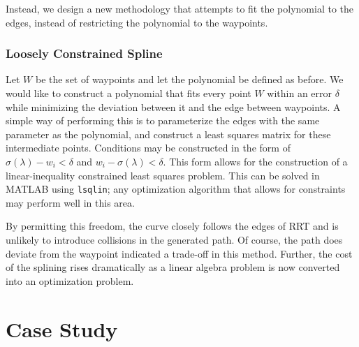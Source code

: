 \documentclass[oneside, 11pt]{book}
\begin{document}
Instead, we design a new methodology that attempts to fit the polynomial to the edges, instead of restricting the polynomial to the waypoints.

\subsection{Loosely Constrained Spline}\label{sec:restrictpolyfit}
Let $W$ be the set of waypoints and let the polynomial be defined as before. We would like to construct a polynomial that fits every point $W$ within an error $\delta$ while minimizing the deviation between it and the edge between waypoints. A simple way of performing this is to parameterize the edges with the same parameter as the polynomial, and construct a least squares matrix for these intermediate points. Conditions may be constructed in the form of $\sigma(\lambda) - w_i < \delta$ and $w_i - \sigma(\lambda) < \delta$. This form allows for the construction of a linear-inequality constrained least squares problem. This can be solved in MATLAB using \texttt{lsqlin}; any optimization algorithm that allows for constraints may perform well in this area.

By permitting this freedom, the curve closely follows the edges of RRT and is unlikely to introduce collisions in the generated path. Of course, the path does deviate from the waypoint indicated a trade-off in this method. Further, the cost of the splining rises dramatically as a linear algebra problem is now converted into an optimization problem.

\chapter{Case Study}
\end{document}
